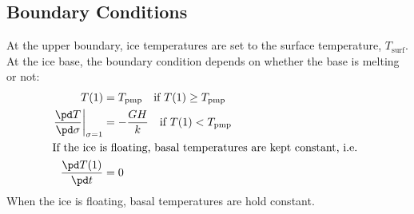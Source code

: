 \subsection{Boundary Conditions}
At the upper boundary, ice temperatures are set to the surface temperature, $T_{\text{surf}}$. At the ice base, the boundary condition depends on whether the base is melting or not:
\begin{subequations}
  \begin{align}
    T(1) &= T_{\text{pmp}} \quad\text{if $T(1)\ge T_{\text{pmp}}$}\\
    \left.\frac{\pd T}{\pd\sigma}\right|_{\sigma=1}&=-\frac{GH}k \quad\text{if $T(1)<T_{\text{pmp}}$}\\
    \intertext{If the ice is floating, basal temperatures are kept constant, i.e. }
    \frac{\pd T(1)}{\pd t} & = 0
  \end{align}
\end{subequations}
When the ice is floating, basal temperatures are hold constant.

